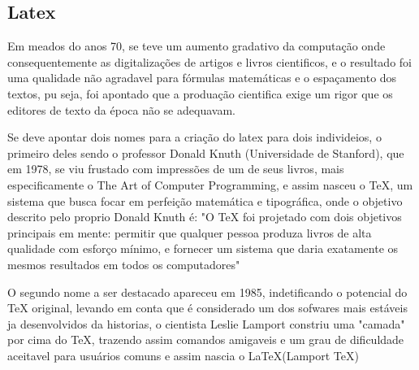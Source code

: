 \documentclass[12pt, a4paper]{article}
\begin{document}
\subsection{}

\subsection{Latex}


Em meados do anos 70, se teve um aumento gradativo da computação onde consequentemente as digitalizações de artigos e livros cientificos, e o resultado foi uma qualidade não agradavel para fórmulas matemáticas e o espaçamento dos textos, pu seja, foi apontado que a produação cientifica exige um rigor que os editores de texto da época não se adequavam.


Se deve apontar dois nomes para a criação do latex para dois individeios, o primeiro deles sendo o professor Donald Knuth (Universidade de Stanford), que em 1978, se viu frustado com impressões de um de seus livros, mais especificamente o The Art of Computer Programming, e assim nasceu o TeX, um sistema que busca focar em perfeição matemática e tipográfica, onde o objetivo descrito pelo proprio Donald Knuth é: "O TeX foi projetado com dois objetivos principais em mente: permitir que qualquer pessoa produza livros de alta qualidade com esforço mínimo, e fornecer um sistema que daria
exatamente os mesmos resultados em todos os computadores"\cite{}

O segundo nome a ser destacado apareceu em 1985, indetificando o potencial do TeX original, levando em conta que é considerado um dos sofwares mais estáveis ja desenvolvidos da historias, o cientista Leslie Lamport constriu uma "camada" por cima do TeX, trazendo assim comandos amigaveis e um grau de dificuldade aceitavel para usuários comuns e assim nascia o LaTeX(Lamport TeX)
\end{document}
